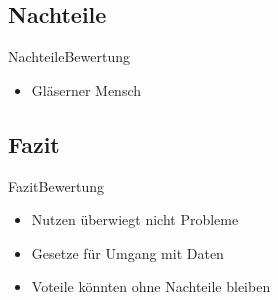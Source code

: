 \documentclass[10pt,a4paper]{beamer}
\begin{document}
\subsection{Nachteile}
\begin{frame}{Nachteile}{Bewertung}
\begin{itemize}
\item Gläserner Mensch
\end{itemize}
\end{frame}

\subsection{Fazit}
\begin{frame}{Fazit}{Bewertung}
\begin{itemize}
\item Nutzen überwiegt nicht Probleme \pause
\item Gesetze für Umgang mit Daten \pause
\item Voteile könnten ohne Nachteile bleiben
\end{itemize}
\end{frame}
\end{document}
